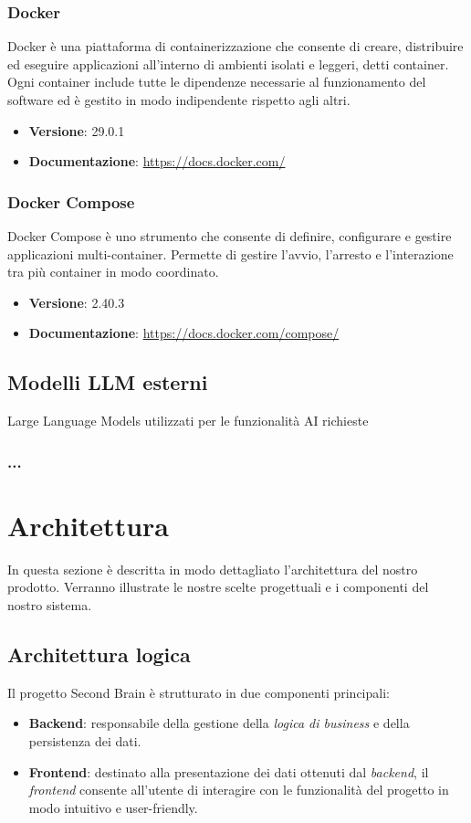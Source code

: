 \documentclass[a4paper,10pt]{article}
\begin{document}
\subsubsection{Docker}
Docker è una piattaforma di containerizzazione che consente di creare, distribuire ed eseguire applicazioni all’interno di ambienti isolati e leggeri, detti container. Ogni container include tutte le dipendenze necessarie al funzionamento del software ed è gestito in modo indipendente rispetto agli altri.
\begin{itemize}
    \item \textbf{Versione}: 29.0.1
    \item \textbf{Documentazione}: \url{https://docs.docker.com/}
\end{itemize}

\subsubsection{Docker Compose}
Docker Compose è uno strumento che consente di definire, configurare e gestire applicazioni multi-container. Permette di gestire l’avvio, l’arresto e l’interazione tra più container in modo coordinato.
\begin{itemize}
    \item \textbf{Versione}: 2.40.3
    \item \textbf{Documentazione}: \url{https://docs.docker.com/compose/}
\end{itemize}

\subsection{Modelli LLM esterni}
Large Language Models utilizzati per le funzionalità AI richieste

\subsubsection{...}

\newpage

\section{Architettura}
In questa sezione è descritta in modo dettagliato l'architettura del nostro prodotto. Verranno illustrate le nostre scelte progettuali e i componenti del nostro sistema.

\subsection{Architettura logica}
Il progetto Second Brain è strutturato in due componenti principali:
\begin{itemize}
    \item \textbf{Backend}: responsabile della gestione della \textit{logica di business} e della persistenza dei dati.
    \item \textbf{Frontend}: destinato alla presentazione dei dati ottenuti dal \textit{backend}, il \textit{frontend} consente all'utente di interagire con le funzionalità del progetto in modo intuitivo e user-friendly.
\end{itemize}
\end{document}
